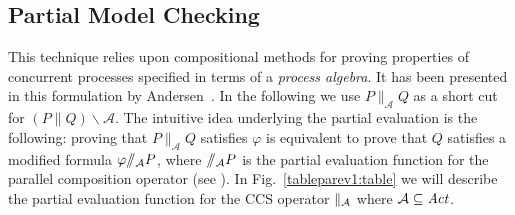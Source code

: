 \documentclass{entcs}
\newcommand{\wrt}{\emph{w.r.t.~}}
\newcommand{\dia}[1]{\langle #1 \rangle}
\newcommand{\arco}[1]{\stackrel{#1}{\longrightarrow}}
\newcommand{\quot}[1]{\slash\!\!\slash {#1}}
\newcommand{\quotres}[2]{\slash\!\!\slash_{#1} #2}
\newcommand{\alphaset}{\mathcal{A}}
\newcommand{\pdc}{\|}
\newcommand{\pdcres}[1]{\|_{#1}}
\newcommand{\mycomp}[1]{\overline{#1}}
\newcommand{\Act}{\mathit {Act}}
\newcommand{\res}{\backslash}
\begin{document}
\subsection{Partial Model Checking}%

This technique relies upon compositional methods for proving
properties of concurrent processes specified in terms of a {\em
process algebra}.  It has been presented in this formulation by
Andersen~\cite{LICS::Andersen1995}. In the following we use
$P\pdcres{\alphaset} Q$ as a short cut for $(P \parallel Q)\res
\alphaset$.  The intuitive idea underlying the partial evaluation is the
following: proving that $P \pdcres{\alphaset} Q$ satisfies $\varphi$
is equivalent to prove that $Q$ satisfies a modified formula
$\varphi\quotres{\cal A}{P}$, where $\quotres{\cal A}{P}$ is the
partial evaluation function for the parallel composition operator (see
\cite{LICS::Andersen1995}). In Fig.~\ref{tableparev1:table} we will
describe the partial evaluation function for the CCS operator
$\parallel_{\cal A}$ where ${\cal A} \subseteq \Act$.

%
%
%
\end{document}
